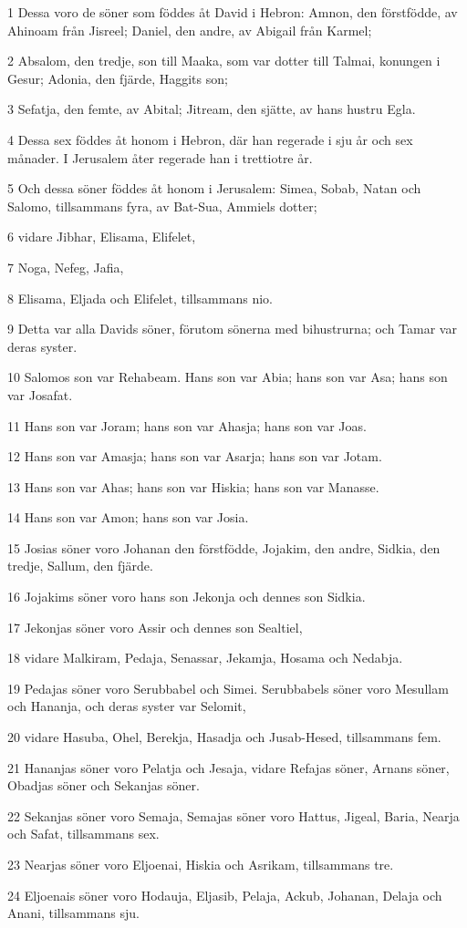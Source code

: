\par 1 Dessa voro de söner som föddes åt David i Hebron: Amnon, den förstfödde, av Ahinoam från Jisreel; Daniel, den andre, av Abigail från Karmel;
\par 2 Absalom, den tredje, son till Maaka, som var dotter till Talmai, konungen i Gesur; Adonia, den fjärde, Haggits son;
\par 3 Sefatja, den femte, av Abital; Jitream, den sjätte, av hans hustru Egla.
\par 4 Dessa sex föddes åt honom i Hebron, där han regerade i sju år och sex månader. I Jerusalem åter regerade han i trettiotre år.
\par 5 Och dessa söner föddes åt honom i Jerusalem: Simea, Sobab, Natan och Salomo, tillsammans fyra, av Bat-Sua, Ammiels dotter;
\par 6 vidare Jibhar, Elisama, Elifelet,
\par 7 Noga, Nefeg, Jafia,
\par 8 Elisama, Eljada och Elifelet, tillsammans nio.
\par 9 Detta var alla Davids söner, förutom sönerna med bihustrurna; och Tamar var deras syster.
\par 10 Salomos son var Rehabeam. Hans son var Abia; hans son var Asa; hans son var Josafat.
\par 11 Hans son var Joram; hans son var Ahasja; hans son var Joas.
\par 12 Hans son var Amasja; hans son var Asarja; hans son var Jotam.
\par 13 Hans son var Ahas; hans son var Hiskia; hans son var Manasse.
\par 14 Hans son var Amon; hans son var Josia.
\par 15 Josias söner voro Johanan den förstfödde, Jojakim, den andre, Sidkia, den tredje, Sallum, den fjärde.
\par 16 Jojakims söner voro hans son Jekonja och dennes son Sidkia.
\par 17 Jekonjas söner voro Assir och dennes son Sealtiel,
\par 18 vidare Malkiram, Pedaja, Senassar, Jekamja, Hosama och Nedabja.
\par 19 Pedajas söner voro Serubbabel och Simei. Serubbabels söner voro Mesullam och Hananja, och deras syster var Selomit,
\par 20 vidare Hasuba, Ohel, Berekja, Hasadja och Jusab-Hesed, tillsammans fem.
\par 21 Hananjas söner voro Pelatja och Jesaja, vidare Refajas söner, Arnans söner, Obadjas söner och Sekanjas söner.
\par 22 Sekanjas söner voro Semaja, Semajas söner voro Hattus, Jigeal, Baria, Nearja och Safat, tillsammans sex.
\par 23 Nearjas söner voro Eljoenai, Hiskia och Asrikam, tillsammans tre.
\par 24 Eljoenais söner voro Hodauja, Eljasib, Pelaja, Ackub, Johanan, Delaja och Anani, tillsammans sju.

